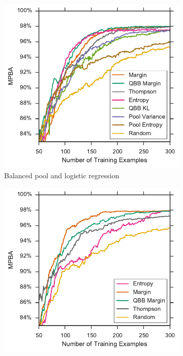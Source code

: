 \begin{figure}[p]
	\centering
	\begin{subfigure}{.5\textwidth}
		\centering
		\includegraphics[width=\textwidth]{figures/5_active/vstatlas_bl_ind_upper}
		\caption{Balanced pool and logistic regression}
		\label{fig:vstatlas_bl_ind_upper}
	\end{subfigure}%
	\begin{subfigure}{.5\textwidth}
		\centering
		\includegraphics[width=\linewidth]{figures/5_active/vstatlas_br_ind_upper}

\end{subfigure}
\end{figure}
